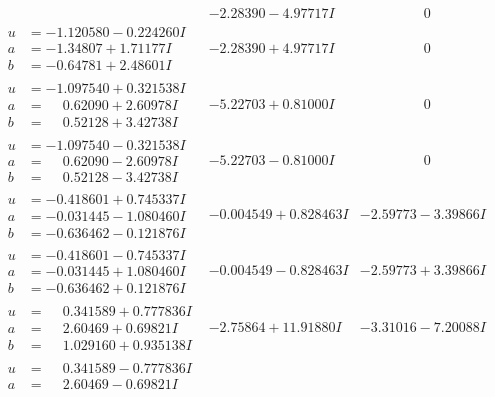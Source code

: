 \documentclass[1p]{elsarticle_modified}
\theoremstyle{definition}
\begin{document}
$$\begin{array}{c|c|c}
 & -2.28390 - 4.97717 I & \phantom{-0.000000 } 0 \\ \hline\begin{aligned}
u &= -1.120580 - 0.224260 I \\
a &= -1.34807 + 1.71177 I \\
b &= -0.64781 + 2.48601 I\end{aligned}
 & -2.28390 + 4.97717 I & \phantom{-0.000000 } 0 \\ \hline\begin{aligned}
u &= -1.097540 + 0.321538 I \\
a &= \phantom{-}0.62090 + 2.60978 I \\
b &= \phantom{-}0.52128 + 3.42738 I\end{aligned}
 & -5.22703 + 0.81000 I & \phantom{-0.000000 } 0 \\ \hline\begin{aligned}
u &= -1.097540 - 0.321538 I \\
a &= \phantom{-}0.62090 - 2.60978 I \\
b &= \phantom{-}0.52128 - 3.42738 I\end{aligned}
 & -5.22703 - 0.81000 I & \phantom{-0.000000 } 0 \\ \hline\begin{aligned}
u &= -0.418601 + 0.745337 I \\
a &= -0.031445 - 1.080460 I \\
b &= -0.636462 - 0.121876 I\end{aligned}
 & -0.004549 + 0.828463 I & -2.59773 - 3.39866 I \\ \hline\begin{aligned}
u &= -0.418601 - 0.745337 I \\
a &= -0.031445 + 1.080460 I \\
b &= -0.636462 + 0.121876 I\end{aligned}
 & -0.004549 - 0.828463 I & -2.59773 + 3.39866 I \\ \hline\begin{aligned}
u &= \phantom{-}0.341589 + 0.777836 I \\
a &= \phantom{-}2.60469 + 0.69821 I \\
b &= \phantom{-}1.029160 + 0.935138 I\end{aligned}
 & -2.75864 + 11.91880 I & -3.31016 - 7.20088 I \\ \hline\begin{aligned}
u &= \phantom{-}0.341589 - 0.777836 I \\
a &= \phantom{-}2.60469 - 0.69821 I \\

\end{aligned}
\end{array}$$
\end{document}
